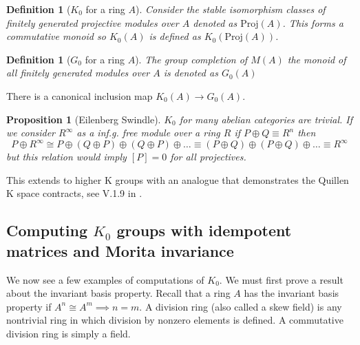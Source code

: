 \documentclass[12pt]{article}
\numberwithin{equation}{section}
\newcounter{dummy} \numberwithin{dummy}{section}
\newtheorem{definition}[dummy]{Definition}
\newtheorem{proposition}[dummy]{Proposition}
\begin{document}
	\begin{definition}[$K_0$ for a ring $A$]
		Consider the stable isomorphism classes of finitely generated projective modules over $A$ denoted as $\mathrm{Proj}(A)$. This forms a commutative monoid so $K_0(A)$ is defined as $K_0(\mathrm{Proj}(A))$.
	\end{definition}
	\begin{definition}[$G_0$ for a ring $A$]
	The group completion of $M(A) $ the monoid of all finitely generated modules over $A$ is denoted as $G_0(A) $ 
	\end{definition}
	There is a canonical inclusion map $K_0(A) \to G_0(A)$.

	\begin{proposition}[Eilenberg Swindle]
		$K_0$ for many abelian categories are trivial. If we consider $R^\infty$ as a inf.g. free module over a ring $R$ if $P \oplus Q \equiv R^n$ then \[ P \oplus R^\infty \cong P \oplus (Q \oplus P) \oplus (Q \oplus P) \oplus \dots \equiv (P \oplus Q) \oplus (P \oplus Q) \oplus \dots \equiv R^\infty \] but this relation would imply $[P]=0 $ for all projectives. 
	\end{proposition}
	This extends to higher K groups with an analogue that demonstrates the Quillen K space contracts, see V.1.9 in \cite{weibel2013k}.
	

	\subsection{Computing $K_0$ groups with idempotent matrices and Morita invariance}\label{k0withidempotent}
	We now see a few examples of computations of $K_0$. We must first prove a result about the invariant basis property. Recall that a ring $A$ has the invariant basis property if $A^n \cong A^m \implies n = m$. A division ring (also called a skew field) is any nontrivial ring in which division by nonzero elements is defined. A commutative division ring is simply a field.
	
\end{document}
